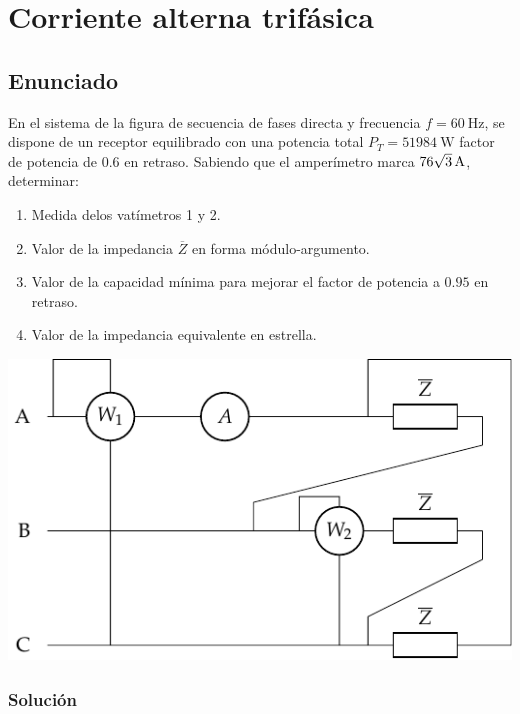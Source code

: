 \chapter{Corriente alterna trifásica}

\section{Enunciado}\label{ej.3-1}

\begin{minipage}{0.595\textwidth}
  En el sistema de la figura de secuencia de fases directa y frecuencia
  $f=\qty{60}{\hertz}$, se dispone de un receptor equilibrado con una
  potencia total $P_T=\qty{51984}{\watt}$ factor de potencia de $0.6$ en
  retraso. Sabiendo que el amperímetro marca
  $\qty[parse-numbers=false]{76\sqrt{3}}{\ampere}$, determinar:
  \begin{enumerate}
  \item Medida delos vatímetros 1 y 2.
  \item Valor de la impedancia $\overline{Z}$ en forma módulo-argumento.
  \item Valor de la capacidad mínima para mejorar el factor de potencia
    a $0.95$ en retraso.
  \item Valor de la impedancia equivalente en estrella.
  \end{enumerate}
\end{minipage}
\begin{minipage}{0.395\textwidth}
    \includegraphics[width=\linewidth]{figuras/ej1_CAtrif.pdf}
\end{minipage}


\subsection{Solución}

